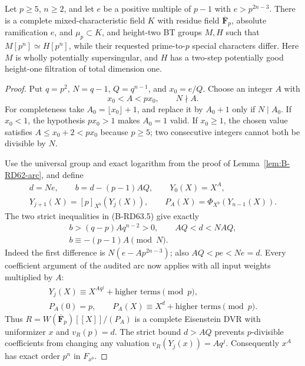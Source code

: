 \begin{theorem}
\label{thm:B-RD63-arc}
Let $p\ge5$, $n\ge2$, and let $e$ be a positive multiple of
$p-1$ with $e>p^{2n-3}$. There is a complete mixed-characteristic
field $K$ with residue field $\overline{\mathbf F}_p$, absolute
ramification $e$, and $\mu_p\subset K$, and height-two BT groups
$M,H$ such that $M[p^n]\simeq H[p^n]$, while their requested
prime-to-$p$ special characters differ. Here $M$ is wholly
potentially supersingular, and $H$ has a two-step potentially
good height-one filtration of total dimension one.
\end{theorem}
\begin{proof}
Put $q=p^2$, $N=q-1$, $Q=q^{n-1}$, and $x_0=e/Q$.
Choose an integer $A$ with
\[
                  x_0<A<px_0,\qquad N\nmid A.          \tag{B-RD63.5}
\]
For completeness take $A_0=\lfloor x_0\rfloor+1$, and replace it
by $A_0+1$ only if $N\mid A_0$. If $x_0<1$, the hypothesis
$px_0>1$ makes $A_0=1$ valid. If $x_0\ge1$, the chosen value
satisfies $A\le x_0+2<px_0$ because $p\ge5$; two consecutive
integers cannot both be divisible by $N$.

Use the universal group and exact logarithm from the proof of
Lemma~\ref{lem:B-RD62-arc}, and define
\[
 \begin{gathered}
 d=Ne,\qquad b=d-(p-1)AQ,\qquad Y_0(X)=X^A,\\
 Y_{j+1}(X)=[p]_{X^b}(Y_j(X)),\qquad
 P_A(X)=\Phi_{X^b}(Y_{n-1}(X)).
 \end{gathered}                                        \tag{B-RD63.6}
\]
The two strict inequalities in (B-RD63.5) give exactly
\[
 \begin{gathered}
 b>(q-p)Aq^{n-2}>0,\qquad AQ<d<NAQ,\\
 b\equiv-(p-1)A\pmod N.
 \end{gathered}                                        \tag{B-RD63.7}
\]
Indeed the first difference is $N(e-Ap^{2n-3})$; also
$AQ<pe<Ne=d$. Every coefficient argument of the audited arc
now applies with all input weights multiplied by $A$:
\[
 \begin{gathered}
 Y_j(X)\equiv X^{Aq^j}+\text{higher terms}\pmod p,\\
 P_A(0)=p,\qquad
 P_A(X)\equiv X^d+\text{higher terms}\pmod p.
 \end{gathered}
\]
Thus $R=W(\overline{\mathbf F}_p)[[X]]/(P_A)$ is a complete
Eisenstein DVR with uniformizer $x$ and $v_R(p)=d$.
The strict bound $d>AQ$ prevents $p$-divisible coefficients from
changing any valuation $v_R(Y_j(x))=Aq^j$. Consequently $x^A$
has exact order $p^n$ in $F_{x^b}$.


\end{proof}
